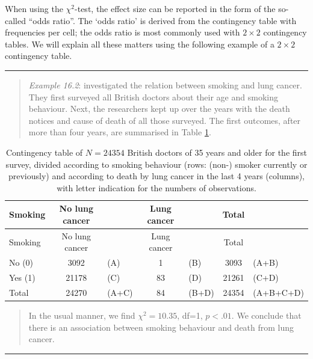 \documentclass[
]{book}
\begin{document}
When using the \(\chi^2\)-test, the effect size can be reported in the form
of the so-called ``odds ratio''. The `odds ratio' is derived from the contingency
table with frequencies per cell; the odds ratio is most commonly used with \(2 \times 2\) contingency tables.
We will explain all these matters using the following example of a \(2 \times 2\) contingency table.

\begin{center}\rule{0.5\linewidth}{0.5pt}\end{center}

\begin{quote}
\emph{Example 16.2}:
\citet{DollHill1956} investigated the relation between smoking
and lung cancer. They first surveyed all British doctors about
their age and smoking behaviour. Next, the researchers kept up over the years with
the death notices and cause of death of all those surveyed. The first
outcomes, after more than four years, are summarised in
Table \ref{tab:dollhill}.
\end{quote}

\begin{longtable}[]{@{}lclclcl@{}}
\caption{\label{tab:dollhill} Contingency table of \(N=24354\) British doctors of 35 years
and older for the first survey, divided according to smoking behaviour (rows: (non-)
smoker currently or previously) and according to death by lung cancer in the last
4 years (columns), with letter indication for the numbers
of observations.}\tabularnewline
\toprule\noalign{}
Smoking & No lung cancer & & Lung cancer & & Total & \\
\midrule\noalign{}
\endfirsthead
\toprule\noalign{}
Smoking & No lung cancer & & Lung cancer & & Total & \\
\midrule\noalign{}
\endhead
\bottomrule\noalign{}
\endlastfoot
No (0) & 3092 & (A) & 1 & (B) & 3093 & (A+B) \\
Yes (1) & 21178 & (C) & 83 & (D) & 21261 & (C+D) \\
Total & 24270 & (A+C) & 84 & (B+D) & 24354 & (A+B+C+D) \\
\end{longtable}

\begin{quote}
In the usual manner, we find \(\chi^2=10.35\), df=1, \(p<.01\). We conclude that
there is an association between smoking behaviour and death from lung cancer.
\end{quote}

\begin{center}\rule{0.5\linewidth}{0.5pt}\end{center}
\end{document}
